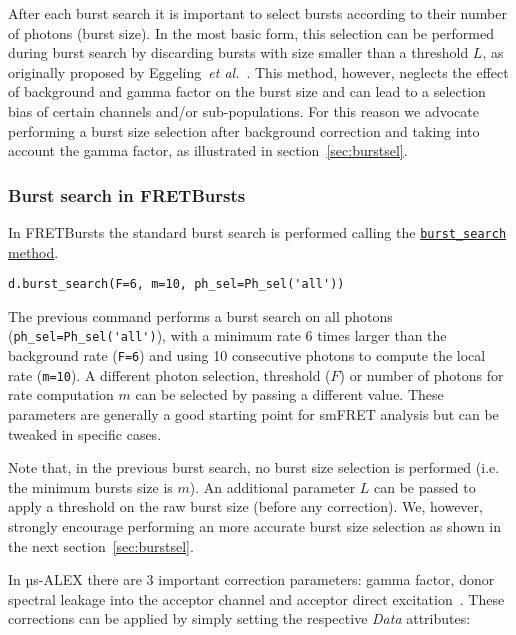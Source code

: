After each burst search it is important to select
bursts according to their number of photons (burst size). In the most
basic form, this selection can be performed during burst search by discarding
bursts with size smaller than a threshold $L$, as originally proposed by 
Eggeling~\textit{et al.}~\cite{Eggeling_1998}. 
This method, however, neglects the effect
of background and gamma factor on the burst size and can lead to a selection
bias of certain channels and/or sub-populations. 
For this reason we advocate performing a burst size selection after background
correction and taking into account the gamma factor, as illustrated in
section~\ref{sec:burstsel}.

\subsubsection{Burst search in FRETBursts}
\label{sec:burstsearch_code}

In FRETBursts the standard burst search is performed calling the
\href{http://fretbursts.readthedocs.org/en/latest/data\_class.html#fretbursts.burstlib.Data.burst\_search}{\texttt{burst\_search} method}.

\begin{verbatim}
d.burst_search(F=6, m=10, ph_sel=Ph_sel('all'))
\end{verbatim}

The previous command performs a burst search on all photons
(\verb|ph_sel=Ph_sel('all')|), with a minimum rate 6 times larger than the
background rate (\verb|F=6|) and using 10 consecutive photons to compute the
local rate (\verb|m=10|).
A different photon selection, threshold ($F$) or number of photons for rate
computation $m$ can be selected by passing a different value. These parameters
are generally a good starting point for smFRET analysis but can be tweaked in
specific cases.

Note that, in the previous burst search, no burst size selection is performed
(i.e. the minimum bursts size is $m$). 
An additional parameter $L$ can be passed to apply a threshold on the raw burst
size (before any correction). 
We, however, strongly encourage performing an more accurate burst size selection as shown in
the next section~\ref{sec:burstsel}.

In µs-ALEX there are 3 important correction parameters: gamma factor, donor spectral
leakage into the acceptor channel and acceptor direct excitation~\cite{Lee_2005}. 
These corrections can be applied by simply setting the respective \textit{Data} attributes:

